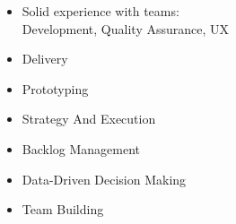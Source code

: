 
  \begin{itemize}
    \setlength\itemsep{-0.3em}
    \item Solid experience with teams: \\ 
    Development,
    Quality Assurance,
    UX 
    \item Delivery
    \item Prototyping
    \item Strategy And Execution 
    \item Backlog Management 
    \item Data-Driven Decision Making
    \wt{
    }
    \item Team Building
  \end{itemize}

  
